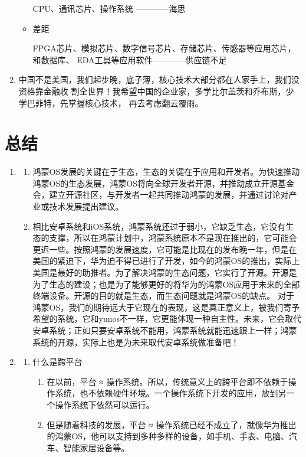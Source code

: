 \documentclass{article}
\begin{document}
\begin{enumerate}
\begin{itemize}
CPU、通讯芯片、操作系统 ————海思  
    \item 差距

FPGA芯片、模拟芯片、数字信号芯片、存储芯片、传感器等应用芯片，和数据库、 EDA工具等应用软件————供应链不足
\end{itemize}
    \item 中国不是美国，我们起步晚，底子薄，核心技术大部分都在人家手上，我们没资格靠金融收 割全世界！我希望中国的企业家，多学比尔盖茨和乔布斯，少学巴菲特，先掌握核心技术， 再去考虑翻云覆雨。

\end{enumerate}

\section{总结}
\begin{enumerate}
    \item \begin{enumerate}
    \item 鸿蒙OS发展的关键在于生态，生态的关键在于应用和开发者。为快速推动鸿蒙OS的生态发展，鸿蒙OS将向全球开发者开源，并推动成立开源基金会，建立开源社区，与开发者一起共同推动鸿蒙的发展，并通过讨论对产业或技术发展提出建议。
    \item 相比安卓系统和iOS系统，鸿蒙系统还过于弱小，它缺乏生态，它没有生态的支撑，所以在鸿蒙计划中，鸿蒙系统原本不是现在推出的，它可能会更迟一些。按照鸿蒙的发展速度，它可能是比现在的发布晚一年，但是在美国的紧迫下，华为迫不得已进行了开发，如今的鸿蒙OS的推出，实际上美国是最好的助推者。为了解决鸿蒙的生态问题，它实行了开源。开源是为了生态的建设；也是为了能够更好的将华为的鸿蒙OS应用于未来的全部终端设备。开源的目的就是生态，而生态问题就是鸿蒙OS的缺点。 对于鸿蒙OS，我们的期待远大于它现在的表现，这是真正意义上，被我们寄予希望的系统，它和yunos不一样，它更能体现一种自主性。未来，它会取代安卓系统；正如只要安卓系统不能用，鸿蒙系统就能迅速跟上一样；鸿蒙系统的开源，实际上也是为未来取代安卓系统做准备吧！
\end{enumerate}
    \item \begin{enumerate}
    \item 什么是跨平台
\begin{enumerate}
    \item 在以前，平台 ≈ 操作系统。所以，传统意义上的跨平台即不依赖于操作系统，也不依赖硬件环境。一个操作系统下开发的应用，放到另一个操作系统下依然可以运行。
    \item 但是随着科技的发展，平台 ≈ 操作系统已经不成立了，就像华为推出的鸿蒙OS，他可以支持到多种多样的设备，如手机、手表、电脑、汽车、智能家居设备等。

\end{enumerate}
\end{enumerate}
\end{enumerate}
\end{document}
